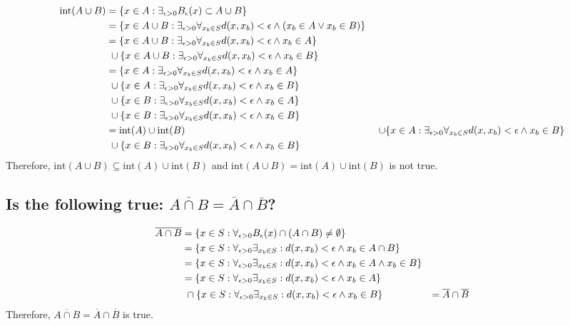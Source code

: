 \documentclass[]{article}
\begin{document}
\begin{align*}
    \text{int}(A \cup B) &= 
        \qty{x \in A : \exists_{\epsilon>0} B_\epsilon(x) \subset A \cup B}\\
    &= \qty{x \in A \cup B : 
        \exists_{\epsilon>0} \forall_{x_b \in S} d(x,x_b)<\epsilon 
        \land (x_b \in A \lor x_b \in B)}\\
    &= \qty{x \in A \cup B : 
            \exists_{\epsilon>0} \forall_{x_b \in S} d(x,x_b)<\epsilon 
            \land x_b \in A}\\
        &\ \cup \qty{x \in A \cup B : 
            \exists_{\epsilon>0} \forall_{x_b \in S} d(x,x_b)<\epsilon 
            \land x_b \in B}\\
    &= \qty{x \in A: \exists_{\epsilon>0} \forall_{x_b \in S} d(x,x_b)<\epsilon 
            \land x_b \in A}\\
        &\ \cup \qty{x \in A: 
            \exists_{\epsilon>0} \forall_{x_b \in S} d(x,x_b)<\epsilon 
            \land x_b \in B}\\
        &\ \cup \qty{x \in B : 
            \exists_{\epsilon>0} \forall_{x_b \in S} d(x,x_b)<\epsilon 
            \land x_b \in A}\\
        &\ \cup \qty{x \in B : 
            \exists_{\epsilon>0} \forall_{x_b \in S} d(x,x_b)<\epsilon 
            \land x_b \in B}\\
    &= \text{int}(A) \cup \text{int}(B)
        &\ \cup \qty{x \in A: 
            \exists_{\epsilon>0} \forall_{x_b \in S} d(x,x_b)<\epsilon 
            \land x_b \in B}\\
        &\ \cup \qty{x \in B : 
            \exists_{\epsilon>0} \forall_{x_b \in S} d(x,x_b)<\epsilon 
            \land x_b \in B}
\end{align*}
Therefore, $\text{int}(A\cup B) \subseteq \text{int}(A) \cup \text{int}(B)$ 
and $\text{int}(A\cup B) = \text{int}(A) \cup \text{int}(B)$ is not true.

\subsection{Is the following true:
$\overline{A\cap B} = \overline{A} \cap \overline{B}$?}
\begin{align*}
    \overline{A \cap B} &= \qty{x \in S : 
                \forall_{\epsilon> 0} B_\epsilon(x) \cap (A \cap B) 
                \neq \emptyset}\\
    &= \qty{x \in S :  \forall_{\epsilon> 0} \exists_{x_b \in S} : 
        d(x,x_b) < \epsilon \land x_b \in A \cap B}\\
    &= \qty{x \in S : \forall_{\epsilon> 0} \exists_{x_b \in S} : 
        d(x,x_b) < \epsilon \land x_b \in A \land x_b \in B}\\
    &= \qty{x \in S : \forall_{\epsilon> 0} \exists_{x_b \in S} : 
            d(x,x_b) < \epsilon \land x_b \in A}\\
        &\ \cap \qty{x \in S : \forall_{\epsilon> 0} \exists_{x_b \in S} : 
            d(x,x_b) < \epsilon \land x_b \in B}
    &= \overline{A} \cap \overline{B}
\end{align*}
Therefore, $\overline{A\cap B} = \overline{A} \cap \overline{B}$ is true.
\end{document}
